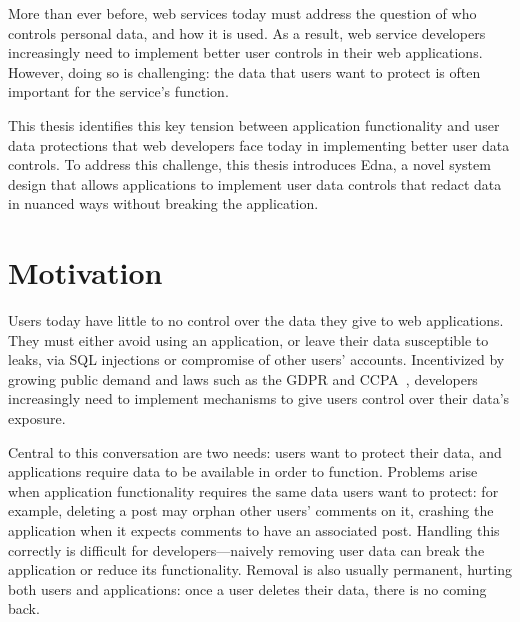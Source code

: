 More than ever before, web services today must address the question of who controls
personal data, and how it is used.
%
As a result, web service developers increasingly need to implement
better user controls in their web applications. However, doing so is challenging: the
data that users want to protect is often important for the service's function.

%
%

%
This thesis identifies this key tension between application functionality and
user data protections that web developers face today in implementing better user
data controls. To address this challenge, this thesis introduces Edna, a novel
system design that allows applications to implement user data controls that
redact data in nuanced ways without breaking the application.
%

\section{Motivation}
\label{sec:intro:motivation}
Users today have little to no control over the data they give to web
applications.  They must either avoid using an application, or leave their data
susceptible to leaks, \eg via SQL injections or compromise of other users'
accounts.  Incentivized by growing public demand and laws such as the GDPR and
CCPA~\cite{eu:gdpr, ccpa}, developers increasingly need to implement mechanisms
to give users control over their data’s exposure.

Central to this conversation are two needs: users want to protect their data,
and applications require data to be available in order to function. Problems
arise when application functionality requires the same data users want to
protect: for example, deleting a post may orphan other users' comments on it,
crashing the application when it expects comments to have an associated post.
Handling this correctly is difficult for developers---naively removing user data
can break the application or reduce its functionality. Removal is also usually
permanent, hurting both users and applications: once a user deletes their data,
there is no coming back.


